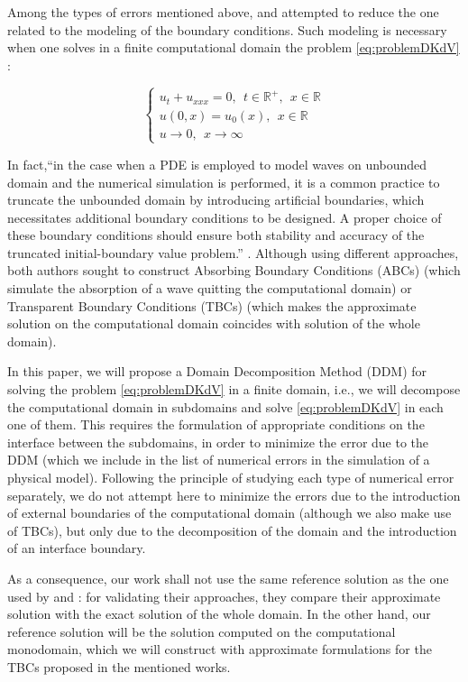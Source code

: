 \indent Among the types of errors mentioned above, \cite{zheng2008} and \cite{besse2015} attempted to reduce the one related to the modeling of the boundary conditions. Such modeling is necessary when one solves in a finite computational domain the problem \eqref{eq:problemDKdV} :

\begin{equation}
 \label{eq:problemDKdV}
\begin{cases}
	u_t + u_{xxx} = 0, \ \ t \in \mathbb{R}^+, \ \ x \in \mathbb{R} \\
	u(0,x) = u_0(x), \ \ x \in \mathbb{R} \\
	u \longrightarrow 0, \ \ x \longrightarrow \infty
\end{cases}
\end{equation}

\indent In fact,``in the case when a PDE is employed to model waves on unbounded domain and the numerical simulation is performed, it is a common practice to truncate the unbounded domain by introducing artificial boundaries, which necessitates additional boundary conditions to be designed. A proper choice of these boundary conditions should ensure both stability and accuracy of the truncated initial-boundary value problem.'' \cite{zheng2008}. Although using different approaches, both authors sought to construct Absorbing Boundary Conditions (ABCs) (which simulate the absorption of a wave quitting the computational domain) or Transparent Boundary Conditions (TBCs) (which makes the approximate solution on the computational domain coincides with solution of the whole domain).

\indent In this paper, we will propose a Domain Decomposition Method (DDM) for solving the problem \eqref{eq:problemDKdV} in a finite domain, i.e., we will decompose the computational domain in subdomains and solve \eqref{eq:problemDKdV} in each one of them. This requires the formulation of appropriate conditions on the interface between the subdomains, in order to minimize the error due to the DDM (which we include in the list of numerical errors in the simulation of a physical model). Following the principle of studying each type of numerical error separately, we do not attempt here to minimize the errors due to the introduction of external boundaries of the computational domain (although we also make use of TBCs), but only due to the decomposition of the domain and the introduction of an interface boundary.

\indent As a consequence, our work shall not use the same reference solution as the one used by \cite{zheng2008} and \cite{besse2015} : for validating their approaches,  they compare their approximate solution with the exact solution of the whole domain. In the other hand, our reference solution will be the solution computed on the computational monodomain, which we will construct with approximate formulations for the TBCs proposed in the mentioned works.

